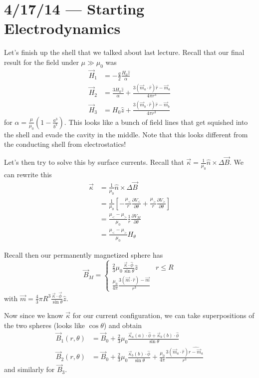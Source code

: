 \documentclass[10pt]{report}
\newcommand{\pd}[2]{\frac{\partial #1}{\partial#2}}
\begin{document}
\chapter{4/17/14 --- Starting Electrodynamics}

Let's finish up the shell that we talked about last lecture. Recall that our final result for the field under $\mu \gg \mu_0$ was
\begin{align}
    \vec{H}_1 &= -\frac{q}{2}\frac{H_0\hat{z}}{\alpha}\\
    \vec{H}_2 &= \frac{3H_0\hat{z}}{\alpha} + \frac{3(\vec{m}_a\cdot\hat{r})\hat{r} - \vec{m}_a}{4\pi r^3}\\
    \vec{H}_3 &= H_0\hat{z} + \frac{3(\vec{m}_b \cdot \hat{r})\hat{r} - \vec{m}_b}{4\pi r^3}
\end{align}
for $\alpha = \frac{\mu}{\mu_0}\left( 1 - \frac{a^3}{b^3} \right)$. This looks like a bunch of field lines that get squished into the shell and evade the cavity in the middle. Note that this looks different from the conducting shell from electrostatics!

Let's then try to solve this by surface currents. Recall that $\vec{\kappa} = \frac{1}{\mu_0}\hat{n}\times \Delta \vec{B}$. We can rewrite this
\begin{align}
    \vec{\kappa} &= \frac{1}{\mu_0}\hat{n}\times \Delta \vec{B}\\
    &= \frac{1}{\mu_0} \left[ -\frac{\mu_<}{r}\pd{V_<}{\theta} + \frac{\mu_>}{r}\pd{V_>}{\theta} \right]\\
    &= \frac{\mu_< - \mu_>}{\mu_0}\frac{1}{r}\pd{V_M}{\theta}\\
    &= \frac{\mu_< - \mu_>}{\mu_0} H_\theta
\end{align}

Recall then our permanently magnetized sphere has
\begin{equation}
    \vec{B}_M =
    \begin{cases}
        \frac{2}{3}\mu_0\frac{\vec{\kappa}\cdot \hat{\phi}}{\sin\theta}\hat{z} & r \leq R\\
        \frac{\mu_0}{4\pi}\frac{3(\vec{m} \cdot \hat{r}) - \vec{m}}{r^3}
    \end{cases}
\end{equation}
with $\vec{m} = \frac{4}{3}\pi R^3\frac{\vec{\kappa}\cdot \vec{\phi}}{\sin\theta}\hat{z}$.

Now since we know $\vec{\kappa}$ for our current configuration, we can take superpositions of the two spheres (looks like $\cos\theta$) and obtain
\begin{align}
    \vec{B}_1(r,\theta) &= \vec{B}_0 + \frac{2}{3}\mu_0\frac{\vec{\kappa}_a(a)\cdot\hat{\phi} + \vec{\kappa}_b(b)\cdot\hat{\phi}}{\sin\theta}\label{4.17.B1}\\
    \vec{B}_2(r,\theta) &= \vec{B}_0 + \frac{2}{3}\mu_0 \frac{\vec{\kappa}_b(b)\cdot\hat{\phi}}{\sin\theta} + \frac{\mu_0}{4\pi}\frac{3(\vec{m}_a\cdot\hat{r})\hat{r - \vec{m}_a}}{r^3}
\end{align}
and similarly for $\vec{B}_3$.
\end{document}
